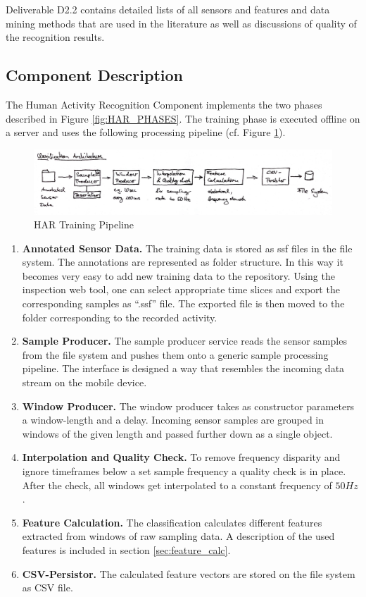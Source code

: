 Deliverable D2.2 contains detailed lists of all sensors and features
and data mining methods that are used in the literature as well as
discussions of quality of the recognition results.

\subsection{Component Description}\label{sec:har_component}

The Human Activity Recognition Component implements the two phases
described in Figure \ref{fig:HAR_PHASES}. The training phase is
executed offline on a server and uses the following processing
pipeline (cf. Figure \ref{fig:classification_architecture}).

\begin{figure}[htbp]
\centering
\includegraphics[width=\textwidth]{img/har/classification_architecture.jpg}
\caption{HAR Training Pipeline}\label{fig:classification_architecture}
\end{figure}

\begin{enumerate}
  \item {\bf Annotated Sensor Data.} The training data is stored as
    ssf files in the file system. The annotations are represented as
    folder structure. In this way it becomes very easy to add new
    training data to the repository. Using the inspection web tool,
    one can select appropriate time slices and export the
    corresponding samples as ``.ssf'' file. The exported file is then
    moved to the folder corresponding to the recorded activity.
  \item {\bf Sample Producer.} The sample producer service reads the 
    sensor samples from the file system and pushes them onto a generic 
    sample processing pipeline. The interface is designed a way that
    resembles the incoming data stream on the mobile device.
  \item {\bf Window Producer.} The window producer takes as
    constructor parameters a window-length and a delay. Incoming
    sensor samples are grouped in windows of the given length and
    passed further down as a single object.
  \item {\bf Interpolation and Quality Check.}  To remove frequency
    disparity and ignore timeframes below a set sample frequency a
    quality check is in place. After the check, all windows get
    interpolated to a constant frequency of $50Hz$.
  \item {\bf Feature Calculation.} The classification calculates
    different features extracted from windows of raw sampling data. A
    description of the used features is included in section
    \ref{sec:feature_calc}.
  \item {\bf CSV-Persistor.} The calculated feature vectors are stored
    on the file system as CSV file. 
\end{enumerate}

